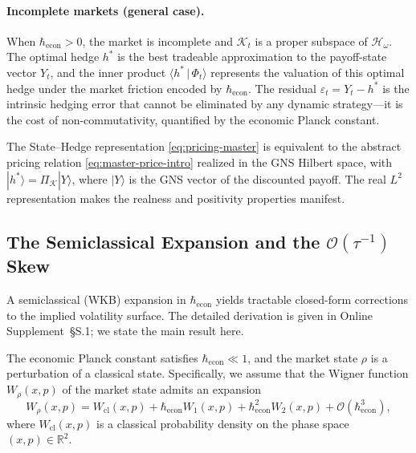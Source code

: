 \begin{remark}
\paragraph{Incomplete markets (general case).}
When $\hbar_{\mathrm{econ}} > 0$, the market is incomplete and $\mathcal{K}_t$ is
a proper subspace of $\mathcal{H}_\omega$. The optimal hedge $h^*$ is the best
tradeable approximation to the payoff-state vector $Y_t$, and the inner product
$\langle h^* \,|\, \Phi_t \rangle$ represents the valuation of this optimal hedge
under the market friction encoded by $\hbar_{\mathrm{econ}}$. The residual
$\varepsilon_t = Y_t - h^*$ is the intrinsic hedging error that cannot be
eliminated by any dynamic strategy---it is the cost of non-commutativity,
quantified by the economic Planck constant.
\end{remark}

\begin{corollary}\label{cor:gns-pricing}
The State--Hedge representation \eqref{eq:pricing-master} is equivalent to the
abstract pricing relation \eqref{eq:master-price-intro} realized in the GNS Hilbert
space, with $|h^*\rangle = \Pi_{\mathcal{K}} |Y\rangle$, where $|Y\rangle$ is the
GNS vector of the discounted payoff. The real $L^2$ representation makes the
realness and positivity properties manifest.
\end{corollary}


\subsection{The Semiclassical Expansion and the $\mathcal{O}(\tau^{-1})$ Skew}
\label{sec:semiclassical}

A semiclassical (WKB) expansion in $\hbar_{\mathrm{econ}}$ yields tractable
closed-form corrections to the implied volatility surface. The detailed derivation
is given in Online Supplement~\S S.1; we state the main result here.

\begin{assumption}\label{ass:wkb}
The economic Planck constant satisfies $\hbar_{\mathrm{econ}} \ll 1$, and the
market state $\rho$ is a perturbation of a classical state. Specifically, we assume
that the Wigner function $W_\rho(x, p)$ of the market state admits an expansion
\begin{equation}\label{eq:wigner-expansion}
    W_\rho(x, p) = W_{\mathrm{cl}}(x, p) + \hbar_{\mathrm{econ}} W_1(x, p)
    + \hbar_{\mathrm{econ}}^2 W_2(x, p) + \mathcal{O}(\hbar_{\mathrm{econ}}^3),
\end{equation}
where $W_{\mathrm{cl}}(x, p)$ is a classical probability density on the phase space
$(x, p) \in \mathbb{R}^2$.
\end{assumption}

